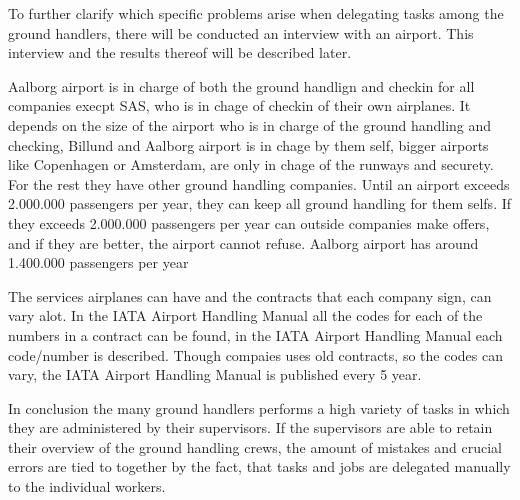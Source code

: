 To further clarify which specific problems arise when delegating tasks among the ground handlers, there will be conducted an interview with an airport. This interview and the results thereof will be described later.

%

Aalborg airport is in charge of both the ground handlign and checkin for all companies execpt SAS, who is in chage of checkin of their own airplanes. It depends on the size of the airport who is in charge of the ground handling and checking, Billund and Aalborg airport is in chage by them self, bigger airports like Copenhagen or Amsterdam, are only in chage of the runways and securety. For the rest they have other ground handling companies.
Until an airport exceeds 2.000.000 passengers per year, they can keep all ground handling for them selfs. If they exceeds 2.000.000 passengers per year can outside companies make offers, and if they are better, the airport cannot refuse.
Aalborg airport has around  1.400.000 passengers per year

The services airplanes can have and the contracts that each company sign, can vary alot. In the IATA Airport Handling Manual all the codes for each of the numbers in a contract can be found, in the IATA Airport Handling Manual each code/number is described. Though compaies uses old contracts, so the codes can vary, the IATA Airport Handling Manual is published every 5 year.

%

In conclusion the many ground handlers performs a high variety of tasks in which they are administered by their supervisors. If the supervisors are able to retain their overview of the ground handling crews, the amount of mistakes and crucial errors are tied to together by the fact, that tasks and jobs are delegated manually to the individual workers.
